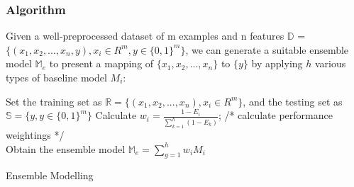 \documentclass[12pt]{article}
\begin{document}
\subsubsection{Algorithm}
Given a well-preprocessed dataset of m examples and n features $\mathbb{D}$ = $\displaystyle \big\{ (x_{1}, x_{2}, ... , x_{n}, y ), x_{i} \in R^{m}, y \in {\{0, 1\}}^{m}  \big\}$, we can generate a suitable ensemble model $\mathbb{M}_{e} $ to present a mapping of $\big\{ x_{1}, x_{2}, ... , x_{n} \big\}$ to $\big\{ y \big\}$ by applying $h$ various types of baseline model $M_{i}$:\\
\IncMargin{2em}
\begin{algorithm}[H]
\BlankLine
Set the training set as $\mathbb{R} = \big\{ (x_{1}, x_{2}, ... , x_{n} ), x_{i} \in R^{m} \big\}$, and the testing set as $\mathbb{S} = \big\{  y, y \in {\{0, 1\}}^{m}  \big\}$\;
Calculate $w_{i} = \frac{1 - E_{i} }{\sum_{k = 1}^{h} (1 - E_{k}) }$; /* calculate performance weightings */\\
Obtain the ensemble model $\mathbb{M}_{e} = \sum_{g = 1}^{h} w_{i} M_{i} $\;
\caption{Ensemble Modelling}\label{ensemble}
\end{algorithm}\DecMargin{2em}
\end{document}
